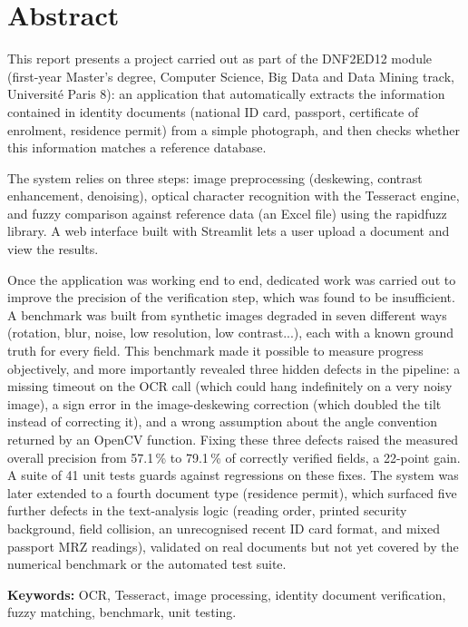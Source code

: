 \chapter*{Abstract}

This report presents a project carried out as part of the DNF2ED12 module (first-year Master's degree, Computer Science, Big Data and Data Mining track, Université Paris 8): an application that automatically extracts the information contained in identity documents (national ID card, passport, certificate of enrolment, residence permit) from a simple photograph, and then checks whether this information matches a reference database.

The system relies on three steps: image preprocessing (deskewing, contrast enhancement, denoising), optical character recognition with the Tesseract engine, and fuzzy comparison against reference data (an Excel file) using the rapidfuzz library. A web interface built with Streamlit lets a user upload a document and view the results.

Once the application was working end to end, dedicated work was carried out to improve the precision of the verification step, which was found to be insufficient. A benchmark was built from synthetic images degraded in seven different ways (rotation, blur, noise, low resolution, low contrast...), each with a known ground truth for every field. This benchmark made it possible to measure progress objectively, and more importantly revealed three hidden defects in the pipeline: a missing timeout on the OCR call (which could hang indefinitely on a very noisy image), a sign error in the image-deskewing correction (which doubled the tilt instead of correcting it), and a wrong assumption about the angle convention returned by an OpenCV function. Fixing these three defects raised the measured overall precision from 57.1\,\% to 79.1\,\% of correctly verified fields, a 22-point gain. A suite of 41 unit tests guards against regressions on these fixes. The system was later extended to a fourth document type (residence permit), which surfaced five further defects in the text-analysis logic (reading order, printed security background, field collision, an unrecognised recent ID card format, and mixed passport MRZ readings), validated on real documents but not yet covered by the numerical benchmark or the automated test suite.

\textbf{Keywords:} OCR, Tesseract, image processing, identity document verification, fuzzy matching, benchmark, unit testing.
